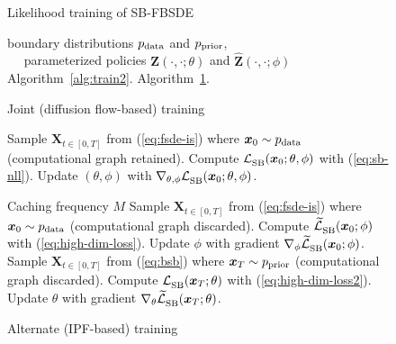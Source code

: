 \documentclass{article}
\def\eqref#1{(\ref{#1})}
\def\rvX{{\mathbf{X}}}
\def\rvZ{{\mathbf{Z}}}
\def\vx{{\bm{x}}}
\newcommand{\pdata}{p_{\rm{data}}}
\begin{document}
{\begin{figure}[t]
\vskip -0.15in
\begin{minipage}[t]{0.48\textwidth}
\begin{algorithm}[H]
\small
     \caption{\small Likelihood training of SB-FBSDE}
     \label{alg:train}
  \begin{algorithmic}
      boundary distributions $\pdata$ and ${ p_\text{\normalfont{prior}} }$,  \\
      $\quad$ parameterized policies $\rvZ(\cdot,\cdot; \theta)$ and $\widehat{\rvZ}(\cdot,\cdot; \phi)$
   \REPEAT
        Algorithm~\ref{alg:train2}.
     \ELSE
        Algorithm~\ref{alg:train3}.
     \ENDIF
  \end{algorithmic}
\end{algorithm}
\vskip -0.25in
\begin{algorithm}[H]
  \small
     \caption{\small Joint (diffusion flow-based) training}
     \label{alg:train2}
  \begin{algorithmic}
         \STATE Sample $\rvX_{t\in[0,T]}$ from \eqref{eq:fsde-is} where $\vx_0 \sim \pdata$ (computational graph retained).
         \STATE Compute $\LSB(\vx_0; \theta, \phi)$ with \eqref{eq:sb-nll}.
         \STATE Update $(\theta,\phi)$ with $\nabla_{\theta,\phi} \LSB(\vx_0; \theta, \phi)$.
      \ENDFOR
  \end{algorithmic}
\end{algorithm}
\end{minipage}
\hfill
\begin{minipage}[t]{0.50\textwidth}
\begin{algorithm}[H]
\small
     \caption{\small Alternate (IPF-based) training}
     \label{alg:train3}
  \begin{algorithmic}
      Caching frequency $M$
         \STATE Sample $\rvX_{t\in[0,T]}$ from \eqref{eq:fsde-is} where $\vx_0 \sim \pdata$ (computational graph discarded).
       \ENDIF
       \STATE Compute $\LSBB(\vx_0; \phi)$ with \eqref{eq:high-dim-loss}.
       \STATE Update $\phi$ with gradient $\nabla_\phi \LSBB(\vx_0; \phi)$.
     \ENDFOR
         \STATE Sample $\rvX_{t\in[0,T]}$ from \eqref{eq:bsb} where $\vx_T \sim \prior$ (computational graph discarded).
       \ENDIF
       \STATE Compute $\LSB(\vx_T; \theta)$ with \eqref{eq:high-dim-loss2}.
       \STATE Update $\theta$ with gradient $\nabla_\theta \LSBB(\vx_T; \theta)$.
     \ENDFOR
  \end{algorithmic}
\end{algorithm}
\end{minipage}
\vskip -0.15in
\end{figure}
}
\end{document}
